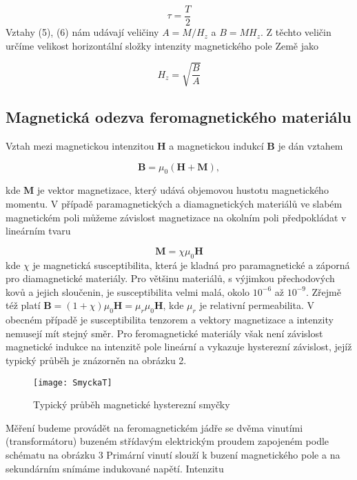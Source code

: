 \documentclass[czech,11pt,a4paper]{article}
\begin{document}
\begin{multicols}{2}
	\begin{equation}
		\tau = \frac T 2
	\end{equation}
	Vztahy (5), (6) nám udávají veličiny $A=M / H_{z}$ a $B=M H_{z}$. Z těchto veličin určíme velikost horizontální složky intenzity magnetického pole Země jako
	
	\begin{equation}
		H_{z}=\sqrt{\frac{B}{A}}
	\end{equation}
	\subsection{Magnetická odezva feromagnetického materiálu}
	Vztah mezi magnetickou intenzitou $\boldsymbol{H}$ a magnetickou indukcí $\boldsymbol{B}$ je dán vztahem
	
\begin{equation}
		\boldsymbol{B}=\mu_{0}(\boldsymbol{H}+\boldsymbol{M}),
\end{equation}
	
	kde $\boldsymbol{M}$ je vektor magnetizace, který udává objemovou hustotu magnetického momentu. V případě paramagnetických a diamagnetických materiálů ve slabém magnetickém poli můžeme závislost magnetizace na okolním poli předpokládat v lineárním tvaru
	
\begin{equation}
		\boldsymbol{M}=\chi \mu_{0} \boldsymbol{H}
\end{equation}
	kde $\chi$ je magnetická susceptibilita, která je kladná pro paramagnetické a záporná pro diamagnetické materiály. Pro většinu materiálů, s výjimkou přechodových kovů a jejich sloučenin, je susceptibilita velmi malá, okolo $10^{-6}$ až $10^{-9}$. Zřejmě též platí $\boldsymbol{B}=(1+\chi) \mu_{0} \boldsymbol{H}=\mu_{r} \mu_{0} \boldsymbol{H}$, kde $\mu_{r}$ je relativní permeabilita. V obecném případě je susceptibilita tenzorem a vektory magnetizace a intenzity nemusejí mít stejný směr. Pro feromagnetické materiály však není závislost magnetické indukce na intenzitě pole lineární a vykazuje hysterezní závislost, jejíž typický průběh je znázorněn na obrázku 2.
		\begin{figure}[H]
		\begin{center}
			
			\texttt{[image: SmyckaT]} 
			\caption{Typický průběh magnetické hysterezní smyčky }
		\end{center}
		
	\end{figure} 
	Měření budeme provádět na feromagnetickém jádře se dvěma vinutími (transformátoru) buzeném střídavým elektrickým proudem zapojeném podle schématu na obrázku 3 Primární vinutí slouží k buzení magnetického pole a na sekundárním snímáme indukované napětí. Intenzitu
		\begin{figure}[H]
		\begin{center}
			

\end{center}
\end{figure}
\end{multicols}
\end{document}
